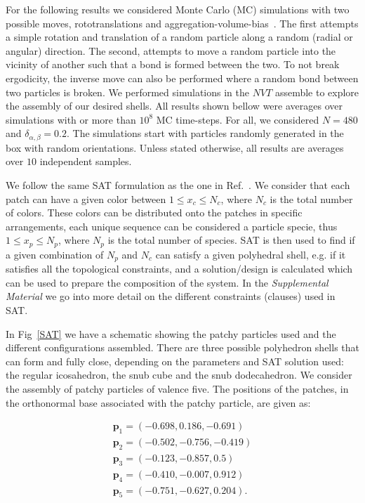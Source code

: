 \documentclass[a4paper, amsfonts, amssymb, amsmath, reprint, showkeys, nofootinbib, oneside]{revtex4-1}
\begin{document}
For the following results we considered Monte Carlo (MC) simulations with two possible moves, rototranslations and aggregation-volume-bias~\cite{Rovigatti2018}. The first attempts a simple rotation and translation of a random particle along a random (radial or angular) direction. The second, attempts to move a random particle into the vicinity of another such that a bond is formed between the two. To not break ergodicity, the inverse move can also be performed where a random bond between two particles is broken. We performed simulations in the $NVT$ assemble to explore the assembly of our desired shells. All results shown bellow were averages over simulations with or more than $10^8$ MC time-steps. For all, we considered $N=480$ and $\delta_{\alpha, \beta}=0.2$. The simulations start with particles randomly generated in the box with random orientations. Unless stated otherwise, all results are averages over $10$ independent samples.

We follow the same SAT formulation as the one in Ref.~\cite{Russo2022}. We consider that each patch can have a given color between $1\leq x_c\leq N_c$, where $N_c$ is the total number of colors. These colors can be distributed onto the patches in specific arrangements, each unique sequence can be considered a particle specie, thus $1\leq x_p\leq N_p$, where $N_p$ is the total number of species. SAT is then used to find if a given combination of $N_p$ and $N_c$ can satisfy a given polyhedral shell, e.g. if it satisfies all the topological constraints, and a solution/design is calculated which can be used to prepare the composition of the system. In the \emph{Supplemental Material} we go into more detail on the different constraints (clauses) used in SAT.

In Fig~\ref{SAT} we have a schematic showing the patchy particles used and the different configurations assembled. There are three possible polyhedron shells that can form and fully close, depending on the parameters and SAT solution used: the regular icosahedron, the snub cube and the snub dodecahedron. We consider the assembly of patchy particles of valence five. The positions of the patches, in the orthonormal base associated with the patchy particle, are given as:

\begin{equation}
    \label{patch}
    \begin{aligned}
    \textbf{p}_1=(-0.698, 0.186, -0.691) \\
    \textbf{p}_2=(-0.502, -0.756, -0.419) \\
    \textbf{p}_3=(-0.123, -0.857, 0.5) \\ 
    \textbf{p}_4=(-0.410, -0.007, 0.912) \\
    \textbf{p}_5=(-0.751, -0.627, 0.204) .
    \end{aligned}
\end{equation}
\end{document}
